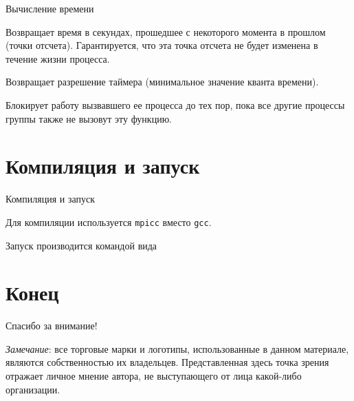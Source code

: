 \documentclass{beamer}
\begin{document}

\begin{frame}{Вычисление времени}

\wtime

Возвращает время в секундах, прошедшее с  некоторого момента в прошлом (точки отсчета). Гарантируется, что эта точка отсчета не будет изменена в течение жизни процесса.

\wtick

Возвращает разрешение таймера (минимальное значение кванта времени). 

\barrier

Блокирует работу вызвавшего ее процесса до тех пор, пока все другие процессы группы также не вызовут эту функцию.

\end{frame}

\section{Компиляция и запуск}


\begin{frame}{Компиляция и запуск}

Для компиляции используется \texttt{mpicc} вместо \texttt{gcc}.

\vfill

Запуск производится командой вида

\mpirun

\end{frame}

\section{Конец}
\begin{frame}

{\huge{Спасибо за внимание!}\par}

\vfill

\tiny{\textit{Замечание}: все торговые марки и логотипы, использованные в данном материале, являются собственностью их владельцев. Представленная здесь точка зрения отражает личное мнение автора, не выступающего от лица какой-либо организации.}

\end{frame}
\end{document}
